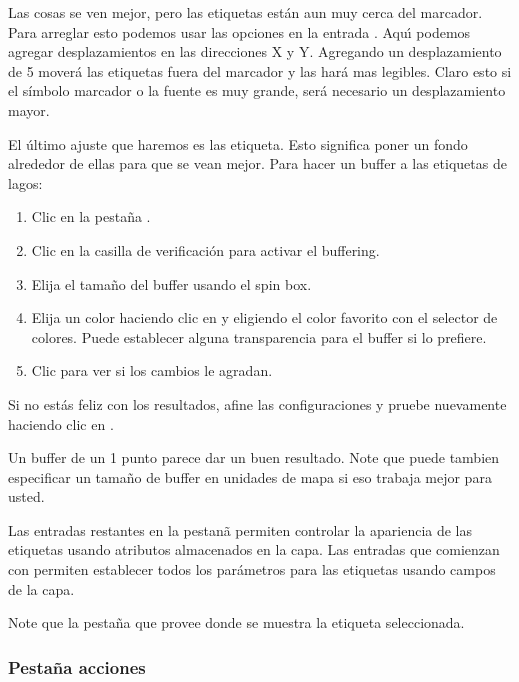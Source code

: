 Las cosas se ven mejor, pero las etiquetas est\'an aun muy cerca del marcador. Para
arreglar esto podemos usar las opciones en la entrada . Aqu\'{\i} podemos agregar 
desplazamientos en las direcciones X y Y. Agregando un desplazamiento de 5 mover\'a las etiquetas
fuera del marcador y las har\'a mas legibles. Claro esto si el s\'{i}mbolo marcador
o la fuente es muy grande, ser\'a necesario un desplazamiento mayor.

El \'ultimo ajuste que haremos es  las etiqueta. Esto significa
poner un fondo alrededor de ellas para que se vean mejor. Para hacer un buffer a las
etiquetas de lagos:

\begin{enumerate}
\item Clic en la pesta\~na .
\item Clic en la casilla de verificaci\'on   para activar el buffering.
\item Elija el tama\~no del buffer usando el spin box.
\item Elija un color haciendo clic en  y eligiendo el color favorito
  con el selector de colores. Puede establecer alguna transparencia para el buffer
  si lo prefiere.
\item Clic  para ver si los cambios le agradan.
\end{enumerate} 

Si no est\'as feliz con los resultados, afine las configuraciones y pruebe nuevamente
haciendo clic en .

Un buffer de un 1 punto parece dar un buen resultado.
Note que puede tambien especificar un tama\~no de buffer en unidades de mapa si eso trabaja mejor
para usted.

Las entradas restantes en la pestan\~a  permiten controlar la apariencia de las
etiquetas usando atributos almacenados en la capa. Las entradas que comienzan con  permiten establecer
todos los par\'ametros para las etiquetas usando campos de la capa.

Note que la pesta\~na  que provee  donde 
se muestra la etiqueta seleccionada.

\subsubsection{Pesta\~na acciones}\label{label_actions}


